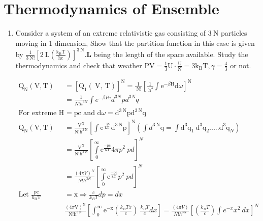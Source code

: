 \section{Thermodynamics of Ensemble}
\begin{enumerate}
	\item Consider a system of an extreme relativistic gas consisting of $3 \mathrm{~N}$ particles moving in 1 dimension, Show that the partition function in this case is given by $\frac{1}{3 \mathrm{~N} !}\left[2 \mathrm{~L}\left(\frac{\mathrm{k}_{\mathrm{B}} \mathrm{T}}{\mathrm{hc}}\right)\right]^{3 \mathrm{~N}} . \mathbf{L}$ being the length of the space available. Study the thermodynamics and check that weather $\mathrm{PV}=\frac{1}{3} \mathrm{U} \cdot \frac{\mathrm{U}}{\mathrm{N}}=3 \mathrm{k}_{\mathrm{B}} \mathrm{T}, \gamma=\frac{4}{3}$ or not.
	\begin{answer}
		\begin{align*}
		\mathrm{Q}_{\mathrm{N}}(\mathrm{V}, \mathrm{T})&=\left[\mathrm{Q}_{1}(\mathrm{~V}, \mathrm{~T})\right]^{\mathrm{N}}=\frac{1}{\mathrm{~N} !}\left[\frac{1}{\mathrm{~h}^{3}} \int \mathrm{e}^{-\beta \mathrm{H}} \mathrm{d} \omega\right]^{\mathrm{N}}\\
		&=\frac{1}{N ! h^{3 N}} \int e^{-\beta P c} d^{3 N} p d^{3 N} q\\
		\text{For extreme relativistic case }\mathrm{H}&=\mathrm{pc}\text{ and } \mathrm{d} \omega=\mathrm{d}^{3 \mathrm{~N}} \mathrm{p} \mathrm{d}^{3 \mathrm{~N}} \mathrm{q}\\
		\mathrm{Q}_{\mathrm{N}}(\mathrm{V}, \mathrm{T})&=\frac{\mathrm{V}^{\mathrm{N}}}{\mathrm{N} ! \mathrm{h}^{3 \mathrm{~N}}}\left[\int \mathrm{e}^{\frac{-\mathrm{pc}}{\mathrm{kT}}} \mathrm{d}^{3 \mathrm{~N}} \mathrm{p}\right]^{\mathrm{N}}\left(\int d^{3 \mathrm{~N}} \mathrm{q}=\int \mathrm{d}^{3} \mathrm{q}_{1} \mathrm{~d}^{3} \mathrm{q}_{\mathrm{2}} .....\mathrm{d}^{3} \mathrm{q}_{N}\right)\\
		&=\frac{\mathrm{V}^{\mathrm{N}}}{\mathrm{N} ! \mathrm{h}^{3 \mathrm{~N}}}\left[\int\limits_{0}^{\infty} \mathrm{e}^{\frac{-\mathrm{pc}}{\mathrm{kT}}}{ 4\pi p }^2\ pd \right]^N\\
		&=\frac{(4 \pi V)^{N}}{N ! h^{3 N}}\left[\int\limits_{0}^{\infty} \mathrm{e}^{\frac{-\mathrm{pc}}{\mathrm{kT}}}{  p }^2\ pd \right]^N\\
		\text{Let }\frac{\mathrm{pc}}{\mathrm{k}_{\mathrm{B}} \mathrm{T}}&=\mathrm{x} \Rightarrow \frac{c}{k_B T} dp=dx\\
		&\frac{(4 \pi \mathrm{V})^{\mathrm{N}}}{\mathrm{N} ! \mathrm{h}^{3 \mathrm{~N}}}\left[\int_{0}^{\infty} \mathrm{e}^{-\mathrm{x}}\left(\frac{k_B Tx}{c}\right)\ \frac{k_B T}{c}dx    \right]=\frac{(4\pi V)}{N!h^{3N}}\left[ \left(\frac{k_B T}{c} \right) \int e^{-x}x^2\ dx\right] ^N\\

\end{align*}
\end{answer}
\end{enumerate}
